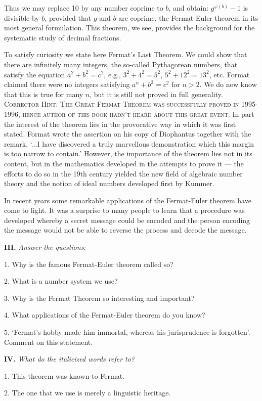 \documentclass[a4paper]{article}
\newcommand{\ETask}[2]{\medskip\par\textbf{#1.} \textit{#2}\par}
\begin{document}
Thus we may replace 10 by any number coprime to $b$, and obtain: $g^{\varphi(b)}-1$ is divisible by $b$, provided that $g$ and $b$
are coprime, the Fermat-Euler theorem in its most general formulation. This theorem, we see, provides the background for the
systematic study of decimal fractions.

To satisfy curiosity we state here Fermat's Last Theorem. We could show that there are infinitely many integers, the so-called
Pythagorean numbers, that satisfy the equation $a^2+b^2=c^2$, e.g., $3^2+4^2=5^2$, $5^2+12^2=13^2$, etc. Format claimed there
were no integers satisfying $a^n+b^2=c^2$ for $n>2$. We do now know that this is true for many $n$, but it is still not proved
in full generality. \textsc{Corrector Hint: The Great Fermat Theorem was successfully proved in 1995-1996, hence author of
this book hadn't heard about this great event.} In part the interest of the theorem lies in the provocative way in which it
was first stated. Format wrote the assertion on his copy of Diophantus together with the remark, `...I have discovered a truly
marvellous demonstration which this margin is too narrow to contain.' However, the importance of the theorem lies not in its
content, but in the mathematics developed in the attempts to prove it --- the efforts to do so in the 19th century yielded the
new field of algebraic number theory and the notion of ideal numbers developed first by Kummer.

In recent years some remarkable applications of the Fermat-Euler theorem have come to light. It was a surprise to many people to
learn that a procedure was developed whereby a secret message could be encoded and the person encoding the message would not be
able to reverse the process and decode the message.

\ETask{III}{Answer the questions:}
1. Why is the famous Fermat-Euler theorem called so?

2. What is a number system we use?

3. Why is the Fermat Theorem so interesting and important?

4. What applications of the Fermat-Euler theorem do you know?

5. `Fermat's hobby made him immortal, whereas his jurisprudence is forgotten'. Comment on this statement.

\ETask{IV}{What do the italicized words refer to?}

1. This theorem was known to Fermat.

2. The one that we use is merely a linguistic heritage.
\end{document}
